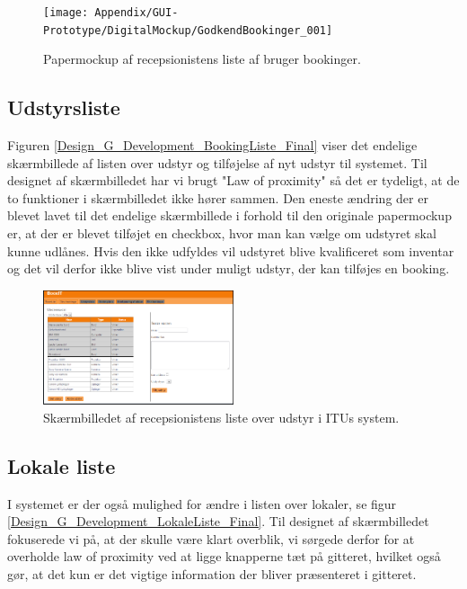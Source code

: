 \begin{figure}[h!]
  \centering
    \texttt{[image: Appendix/GUI-Prototype/DigitalMockup/GodkendBookinger\_001]}
  \caption{Papermockup af recepsionistens liste af bruger bookinger.}
\label{Design_G_Development_BookingListe}
\end{figure} 

\subsection{Udstyrsliste}
Figuren \ref{Design_G_Development_BookingListe_Final} viser det endelige skærmbillede af listen over udstyr og tilføjelse af nyt udstyr til systemet. Til designet af skærmbilledet har vi brugt "Law of proximity" så det er tydeligt, at de to funktioner i skærmbilledet ikke hører sammen. Den eneste ændring der er blevet lavet til det endelige skærmbillede  i forhold til den originale papermockup er, at der er blevet tilføjet en checkbox, hvor man kan vælge om udstyret skal kunne udlånes. Hvis den ikke udfyldes vil udstyret blive kvalificeret som inventar og det vil derfor ikke blive vist under muligt udstyr, der kan tilføjes en booking. 

\begin{figure}[h!]
  \centering
    \includegraphics[width=0.5\textwidth]{Appendix/GUI-Prototype/DigitalMockup/UdstyrsListe}
  \caption{Skærmbilledet af recepsionistens liste over udstyr i ITUs system.}
\label{Design_G_Development_UdstyrsListe_Final}
\end{figure} 

\subsection{Lokale liste}
I systemet er der også mulighed for ændre i listen over lokaler, se figur \ref{Design_G_Development_LokaleListe_Final}. Til designet af skærmbilledet fokuserede vi på, at der skulle være klart overblik, vi sørgede derfor for at overholde law of proximity ved at ligge knapperne tæt på gitteret, hvilket også gør, at det kun er det vigtige information der bliver præsenteret i gitteret.

